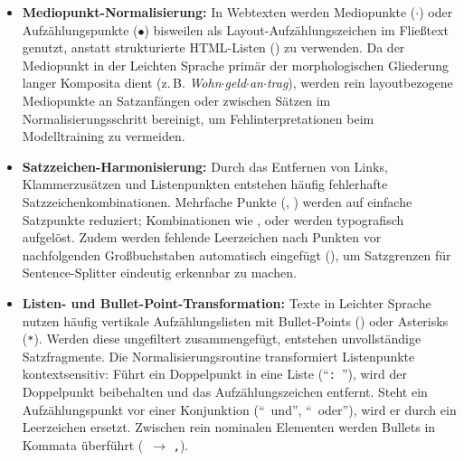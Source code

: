 \begin{itemize}
    \item \textbf{Mediopunkt-Normalisierung:} In Webtexten werden Mediopunkte ($\cdot$) oder Aufzählungspunkte ($\bullet$) bisweilen als Layout-Aufzählungszeichen im Fließtext genutzt, anstatt strukturierte HTML-Listen () zu verwenden. Da der Mediopunkt in der Leichten Sprache primär der morphologischen Gliederung langer Komposita dient (z.\,B. \textit{Wohn$\cdot$geld$\cdot$an$\cdot$trag}), werden rein layoutbezogene Mediopunkte an Satzanfängen oder zwischen Sätzen im Normalisierungsschritt bereinigt, um Fehlinterpretationen beim Modelltraining zu vermeiden.
    \item \textbf{Satzzeichen-Harmonisierung:} Durch das Entfernen von Links, Klammerzusätzen und Listenpunkten entstehen häufig fehlerhafte Satzzeichenkombinationen. Mehrfache Punkte (, ) werden auf einfache Satzpunkte reduziert; Kombinationen wie ,  oder  werden typografisch aufgelöst. Zudem werden fehlende Leerzeichen nach Punkten vor nachfolgenden Großbuchstaben automatisch eingefügt (), um Satzgrenzen für Sentence-Splitter eindeutig erkennbar zu machen.
    \item \textbf{Listen- und Bullet-Point-Transformation:} Texte in Leichter Sprache nutzen häufig vertikale Aufzählungslisten mit Bullet-Points (\textbullet) oder Asterisks (\texttt{*}). Werden diese ungefiltert zusammengefügt, entstehen unvollständige Satzfragmente. Die Normalisierungsroutine transformiert Listenpunkte kontextsensitiv: Führt ein Doppelpunkt in eine Liste (\enquote{\texttt{:}\ \textbullet}), wird der Doppelpunkt beibehalten und das Aufzählungszeichen entfernt. Steht ein Aufzählungspunkt vor einer Konjunktion (\enquote{\textbullet\ und}, \enquote{\textbullet\ oder}), wird er durch ein Leerzeichen ersetzt. Zwischen rein nominalen Elementen werden Bullets in Kommata überführt (\textbullet\ $\to$ \texttt{,}).

\end{itemize}
